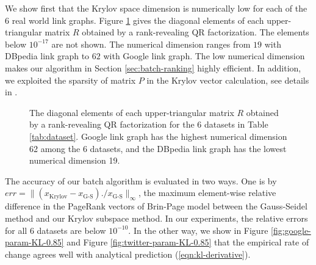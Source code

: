 \documentclass[conference]{IEEEtran}
\begin{document}
We show first that the Krylov space dimension is numerically low for each of the 6 real world link graphs.
Figure \ref{fig:qr} gives the diagonal elements of each upper-triangular matrix $R$ obtained by a 
rank-revealing QR factorization. The elements below $10^{-17}$ are not shown. The numerical 
dimension ranges from $19$ with DBpedia link graph to $62$ with Google link graph. The low numerical 
dimension makes our algorithm in Section \ref{sec:batch-ranking} highly efficient. In addition, we 
exploited the sparsity of matrix $P$ in the Krylov vector calculation, see details in \cite{MS-Xichen-2018}.

\begin{figure}[!htb]
  \centering
  \caption{The diagonal elements of each upper-triangular matrix $R$ obtained by a rank-revealing QR factorization for the 6 datasets in Table \ref{tab:dataset}. Google link graph has the highest numerical dimension 62 among the 6 datasets, and the DBpedia link graph has the lowest numerical dimension 19.}
  \label{fig:qr}
\end{figure}

%

The accuracy of our batch algorithm is evaluated in two ways. One is by 
$err = \|(x_{\text{Krylov}} - x_{\text{G-S}}) ./ x_{\text{G-S}}\|_{\infty}$, 
the maximum element-wise relative difference in
the PageRank vectors of Brin-Page model between the Gauss-Seidel method and 
our Krylov subspace method. In our experiments, the relative errors for all 6 datasets 
are below $10^{-10}$. In the other way, we show in 
Figure \ref{fig:google-param-KL-0.85} and Figure \ref{fig:twitter-param-KL-0.85} 
that the empirical rate of change agrees well with analytical prediction 
(\ref{eqn:kl-derivative}).


 
% 

\end{document}
